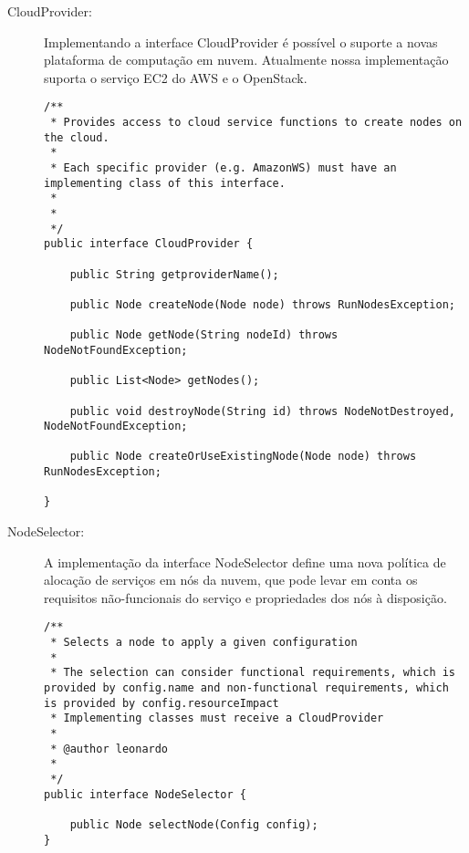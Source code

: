 \begin{description}

\item [CloudProvider:] 

Implementando a interface CloudProvider é possível o suporte a novas plataforma de computação em nuvem. Atualmente nossa implementação suporta o serviço EC2 do AWS e o OpenStack.

\begin{lstlisting}[frame=trbl, label=lst:cloud_provider, caption=Interface CloudProvider]
/**
 * Provides access to cloud service functions to create nodes on the cloud. 
 * 
 * Each specific provider (e.g. AmazonWS) must have an implementing class of this interface.
 * 
 * 
 */
public interface CloudProvider {

	public String getproviderName();
	
	public Node createNode(Node node) throws RunNodesException;

	public Node getNode(String nodeId) throws NodeNotFoundException;

	public List<Node> getNodes();

	public void destroyNode(String id) throws NodeNotDestroyed, NodeNotFoundException;

	public Node createOrUseExistingNode(Node node) throws RunNodesException;

}
\end{lstlisting}


\item [NodeSelector:]

A implementação da interface NodeSelector define uma nova política de alocação de serviços em nós da nuvem, que pode levar em conta os requisitos não-funcionais do serviço e propriedades dos nós à disposição.

\begin{lstlisting}[frame=trbl, label=lst:node_selector, caption=Interface NodeSelector]
/**
 * Selects a node to apply a given configuration
 * 
 * The selection can consider functional requirements, which is provided by config.name and non-functional requirements, which is provided by config.resourceImpact
 * Implementing classes must receive a CloudProvider
 * 
 * @author leonardo
 *
 */
public interface NodeSelector {

	public Node selectNode(Config config);
}
\end{lstlisting}


\end{description}
